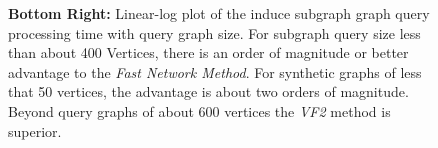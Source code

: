 \begin{figure}[h]
{\textbf{Bottom Right:} Linear-log plot of the induce subgraph graph query processing time with query graph size. For subgraph query size less than about 400 Vertices, there is an order of magnitude or better advantage to the \textit{Fast Network Method}. For synthetic graphs of less that 50 vertices, the advantage is about two orders of magnitude. Beyond query graphs of about 600 vertices the \textit{VF2} method is superior.
}
\label{fig:fig91}
\end{figure}
%



